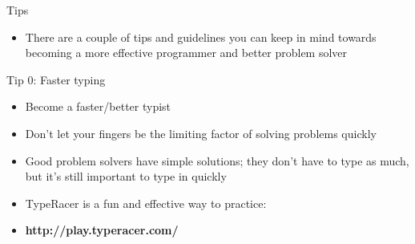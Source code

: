 \documentclass[10pt]{beamer}
\newcommand{\bi}{\begin{itemize}}
\newcommand{\ei}{\end{itemize}}
\begin{document}
\begin{frame}{Tips}
    \bi
        \item There are a couple of tips and guidelines you can keep in mind towards becoming a more effective programmer and better problem solver

    \ei
\end{frame}

\begin{frame}{Tip 0: Faster typing}
    \bi
        \item Become a faster/better typist
        \item Don't let your fingers be the limiting factor of solving problems quickly
        \item Good problem solvers have simple solutions; they don't have to type as much, but it's still important to type in quickly
        \vspace{20pt}
        \item TypeRacer is a fun and effective way to practice:
        \item \textbf{http://play.typeracer.com/}
    \ei
\end{frame}
\end{document}
